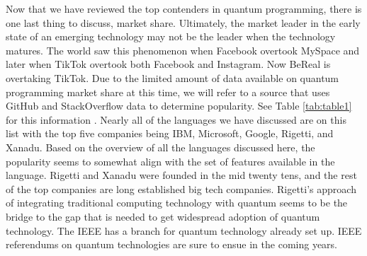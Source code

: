 \documentclass[conference]{IEEEtran}
\begin{document}
Now that we have reviewed the top contenders in quantum programming, there is one last thing to discuss, market share. Ultimately, the market leader in the early state of an emerging technology may not be the leader when the technology matures. The world saw this phenomenon when Facebook overtook MySpace and later when TikTok overtook both Facebook and Instagram. Now BeReal is overtaking TikTok. Due to the limited amount of data available on quantum programming market share at this time, we will refer to a source that uses GitHub and StackOverflow data to determine popularity. See Table \ref{tab:table1} for this information \cite{b16}. Nearly all of the languages we have discussed are on this list with the top five companies being IBM, Microsoft, Google, Rigetti, and Xanadu. Based on the overview of all the languages discussed here, the popularity seems to somewhat align with the set of features available in the language. Rigetti and Xanadu were founded in the mid twenty tens, and the rest of the top companies are long established big tech companies. Rigetti's approach of integrating traditional computing technology with quantum seems to be the bridge to the gap that is needed to get widespread adoption of quantum technology. The IEEE has a branch for quantum technology already set up. IEEE referendums on quantum technologies are sure to ensue in the coming years.
\end{document}
